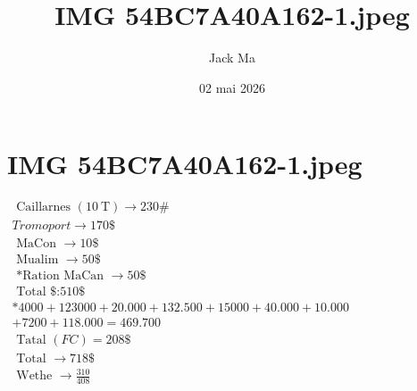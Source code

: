 \documentclass[12pt,a4paper]{article}
\title{IMG 54BC7A40A162-1.jpeg}
\author{Jack Ma}
\date{02 mai 2026}
\begin{document}
\maketitle

\section*{IMG 54BC7A40A162-1.jpeg}
$\begin{array}{l}
\text { Caillarnes }(10 \mathrm{~T}) \longrightarrow 230 \# \\
Tromoport \longrightarrow 170\$  \\
\text { MaCon } \longrightarrow 10 \$ \\
\text { Mualim } \longrightarrow50 \$ \\
\text { *Ration MaCan } \longrightarrow 50 \$ \\
\text { Total \$:510\$ } \\
* 4000+123000+20.000+132.500+15000+40.000+10.000 \\
+7200+118.000=469.700 \\
\text { Tatal }(F C)=208 \$ \\
\text { Total } \longrightarrow 718 \$ \\
\text { Wethe } \rightarrow \frac{310}{408}
\end{array}$
\end{document}
